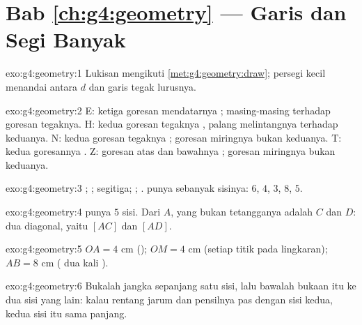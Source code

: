\section*{Bab \ref{ch:g4:geometry} --- Garis dan Segi Banyak}

\begin{solution}{exo:g4:geometry:1}
Lukisan mengikuti \cref{met:g4:geometry:draw}; persegi kecil
menandai  antara $d$ dan garis tegak lurusnya.
\end{solution}

\begin{solution}{exo:g4:geometry:2}
E: ketiga goresan mendatarnya ; masing-masing 
terhadap goresan tegaknya. H: kedua goresan tegaknya , palang
melintangnya  terhadap keduanya. N: kedua goresan
tegaknya ; goresan miringnya bukan keduanya. T: kedua
goresannya . Z: goresan atas dan bawahnya ;
goresan miringnya bukan keduanya.
\end{solution}

\begin{solution}{exo:g4:geometry:3}
; ; segitiga; ; .  punya  sebanyak sisinya: $6$, $4$, $3$, $8$, $5$.
\end{solution}

\begin{solution}{exo:g4:geometry:4}
 punya $5$ sisi. Dari $A$, yang bukan tetangganya adalah
$C$ dan $D$: dua diagonal, yaitu $[AC]$ dan $[AD]$.
\end{solution}

\begin{solution}{exo:g4:geometry:5}
$OA = 4$ cm (); $OM = 4$ cm (setiap titik pada lingkaran);
$AB = 8$ cm ( dua kali ).
\end{solution}

\begin{solution}{exo:g4:geometry:6}
Bukalah jangka sepanjang satu sisi, lalu bawalah bukaan itu ke dua
sisi yang lain: kalau rentang jarum dan pensilnya pas dengan sisi
kedua, kedua sisi itu sama panjang.
\end{solution}

